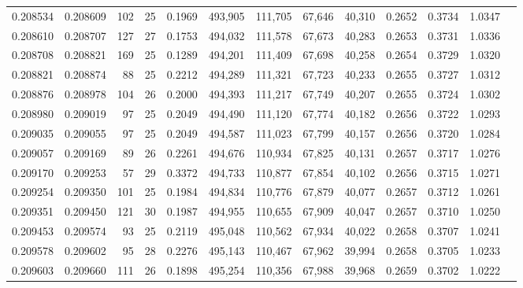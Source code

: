 \begin{tabular}{rrrrrrrrrrrrr}
0.208534 & 0.208609 & 102 &  25 &                                     0.1969 & 493,905 & 111,705 &  67,646 &  40,310 & 0.2652 & 0.3734 & 1.0347 \\
0.208610 & 0.208707 & 127 &  27 &                                     0.1753 & 494,032 & 111,578 &  67,673 &  40,283 & 0.2653 & 0.3731 & 1.0336 \\
0.208708 & 0.208821 & 169 &  25 &                                     0.1289 & 494,201 & 111,409 &  67,698 &  40,258 & 0.2654 & 0.3729 & 1.0320 \\
0.208821 & 0.208874 &  88 &  25 &                                     0.2212 & 494,289 & 111,321 &  67,723 &  40,233 & 0.2655 & 0.3727 & 1.0312 \\
0.208876 & 0.208978 & 104 &  26 &                                     0.2000 & 494,393 & 111,217 &  67,749 &  40,207 & 0.2655 & 0.3724 & 1.0302 \\
0.208980 & 0.209019 &  97 &  25 &                                     0.2049 & 494,490 & 111,120 &  67,774 &  40,182 & 0.2656 & 0.3722 & 1.0293 \\
0.209035 & 0.209055 &  97 &  25 &                                     0.2049 & 494,587 & 111,023 &  67,799 &  40,157 & 0.2656 & 0.3720 & 1.0284 \\
0.209057 & 0.209169 &  89 &  26 &                                     0.2261 & 494,676 & 110,934 &  67,825 &  40,131 & 0.2657 & 0.3717 & 1.0276 \\
0.209170 & 0.209253 &  57 &  29 &                                     0.3372 & 494,733 & 110,877 &  67,854 &  40,102 & 0.2656 & 0.3715 & 1.0271 \\
0.209254 & 0.209350 & 101 &  25 &                                     0.1984 & 494,834 & 110,776 &  67,879 &  40,077 & 0.2657 & 0.3712 & 1.0261 \\
0.209351 & 0.209450 & 121 &  30 &                                     0.1987 & 494,955 & 110,655 &  67,909 &  40,047 & 0.2657 & 0.3710 & 1.0250 \\
0.209453 & 0.209574 &  93 &  25 &                                     0.2119 & 495,048 & 110,562 &  67,934 &  40,022 & 0.2658 & 0.3707 & 1.0241 \\
0.209578 & 0.209602 &  95 &  28 &                                     0.2276 & 495,143 & 110,467 &  67,962 &  39,994 & 0.2658 & 0.3705 & 1.0233 \\
0.209603 & 0.209660 & 111 &  26 &                                     0.1898 & 495,254 & 110,356 &  67,988 &  39,968 & 0.2659 & 0.3702 & 1.0222 \\

\end{tabular}
